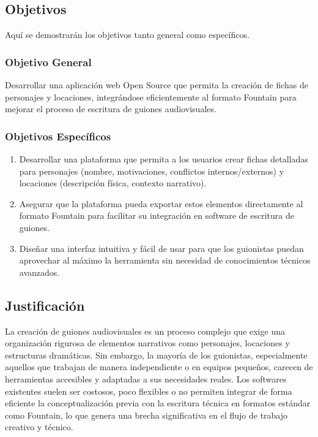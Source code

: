 \documentclass[12pt]{article}
\begin{document}
	\newpage

	\subsection{Objetivos}

	Aquí se demostrarán los objetivos tanto general como específicos.

	\subsubsection{Objetivo General}
	Desarrollar una aplicación web Open Source que permita la creación de fichas de personajes y locaciones, integrándose eficientemente al formato Fountain para mejorar el proceso de escritura de guiones audiovisuales.

	\subsubsection{Objetivos Específicos}
	\begin{enumerate}
		\item Desarrollar una plataforma que permita a los usuarios crear fichas detalladas para personajes (nombre, motivaciones, conflictos internos/externos) y locaciones (descripción física, contexto narrativo).
		\item Asegurar que la plataforma pueda exportar estos elementos directamente al formato Fountain para facilitar su integración en software de escritura de guiones.
		\item Diseñar una interfaz intuitiva y fácil de usar para que los guionistas puedan aprovechar al máximo la herramienta sin necesidad de conocimientos técnicos avanzados.
	\end{enumerate}

	\newpage

	\subsection{Justificación}

	La creación de guiones audiovisuales es un proceso complejo que exige una organización rigurosa de elementos narrativos como personajes, locaciones y estructuras dramáticas. Sin embargo, la mayoría de los guionistas, especialmente aquellos que trabajan de manera independiente o en equipos pequeños, carecen de herramientas accesibles y adaptadas a sus necesidades reales. Los softwares existentes suelen ser costosos, poco flexibles o no permiten integrar de forma eficiente la conceptualización previa con la escritura técnica en formatos estándar como Fountain, lo que genera una brecha significativa en el flujo de trabajo creativo y técnico.
\end{document}
